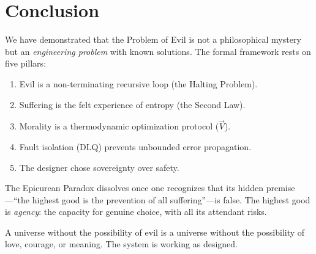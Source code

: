 \documentclass[12pt, a4paper]{article}
\theoremstyle{plain}
\theoremstyle{definition}
\begin{document}
\section{Conclusion}\label{sec:conclusion}

We have demonstrated that the Problem of Evil is not a philosophical
mystery but an \emph{engineering problem} with known solutions. The formal
framework rests on five pillars:

\begin{enumerate}
  \item Evil is a non-terminating recursive loop (the Halting Problem).
  \item Suffering is the felt experience of entropy (the Second Law).
  \item Morality is a thermodynamic optimization protocol ($\vec{V}$).
  \item Fault isolation (DLQ) prevents unbounded error propagation.
  \item The designer chose sovereignty over safety.
\end{enumerate}

The Epicurean Paradox dissolves once one recognizes that its hidden
premise---``the highest good is the prevention of all suffering''---is
false. The highest good is \emph{agency}: the capacity for genuine choice,
with all its attendant risks.

A universe without the possibility of evil is a universe without the
possibility of love, courage, or meaning. The system is working as designed.


\vspace{2em}
\noindent\hrulefill
\vspace{1em}







\vspace{3em}
\noindent\hrulefill
\vspace{1em}
\end{document}
